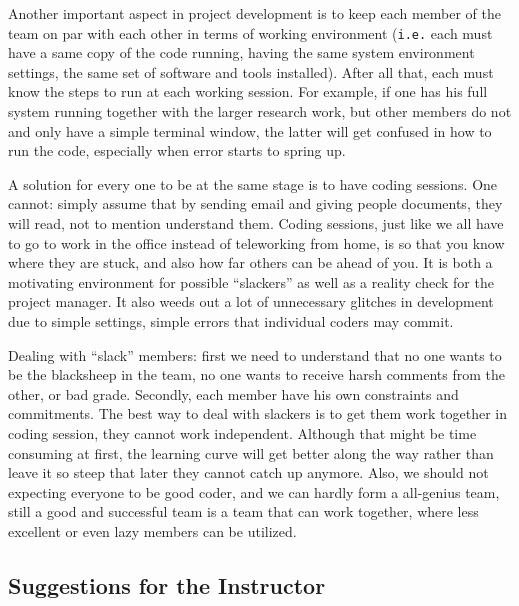 Another important aspect in project development is to keep each member of
the team on par with each other in terms of working environment
(\texttt{i.e.} each must have a same copy of the code running, having the
same system environment settings, the same set of software and tools
installed). After all that, each must know the steps to run at each
working session. For example, if one has his full system running together
with the larger research work, but other members do not and only have
a simple terminal window, the latter will get confused in how to run the
code, especially when error starts to spring up.

A solution for every one to be at the same stage is to have coding
sessions. One cannot: simply assume that by sending email and giving people
documents, they will read, not to mention understand them. Coding sessions,
just like we all have to go to work in the office instead of teleworking
from home, is so that you know where they are stuck, and also how far
others can be ahead of you. It is both a motivating environment for
possible ``slackers'' as well as a reality check for the project manager.
It also weeds out a lot of unnecessary glitches in development due to
simple settings, simple errors that individual coders may commit.

Dealing with ``slack'' members: first we need to understand that no one
wants to be the blacksheep in the team, no one wants to receive harsh
comments from the other, or bad grade. Secondly, each member have his own
constraints and commitments. The best way to deal with slackers is to get
them work together in coding session, they cannot work independent.
Although that might be time consuming at first, the learning curve will get
better along the way rather than leave it so steep that later they cannot
catch up anymore. Also, we should not expecting everyone to be good coder, 
and we can hardly form a all-genius team, still a good and successful team 
is a team that can work together, where less excellent or even lazy members
can be utilized.

\subsection{Suggestions for the Instructor}
 
